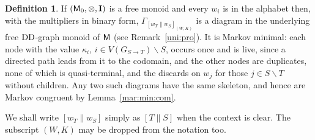 \documentclass[12pt]{amsart}
\theoremstyle{plain}
\theoremstyle{definition}
\newtheorem{defn}[thm]{Definition}
\theoremstyle{remark}
\numberwithin{equation}{section}
\theoremstyle{plain}
\newcommand{\0}{\emptyset}
\newcommand{\mi}{\smallsetminus}
\newcommand{\cat}[1]{\textup{\textsf{#1}}}
\newcommand{\moi}{\mathbf{I}}
\newcommand{\stri}{\Gamma}
\newcommand{\DD}{\textup{DD}}
\begin{document}
\begin{defn}
If $(\cat M_0, \otimes, \moi)$ is a free monoid and every $w_i$ is in the alphabet then, with the multipliers in binary form, $\stri_{[w_T \| w_S]_{(W, K)}}$ is a diagram in the underlying free $\DD$-graph monoid of $\cat M$ (see Remark~\ref{uni:pro}). It is Markov minimal: each node with the value $\kappa_i$, $i \in V(G_{S \rightarrow T}) \mi S$, occurs once and is live, since a directed path leads from it to the codomain, and the other nodes are duplicates, none of which is quasi-terminal, and the discards on $w_j$ for those $j \in S \mi T$ without children. Any two such diagrams have the same skeleton, and hence are Markov congruent by Lemma~\ref{mar:min:com}.
\end{defn}

We shall write $[w_T \| w_S]$ simply as $[T \| S]$ when the context is clear. The subscript $(W, K)$ may be dropped from the notation too.
\end{document}
